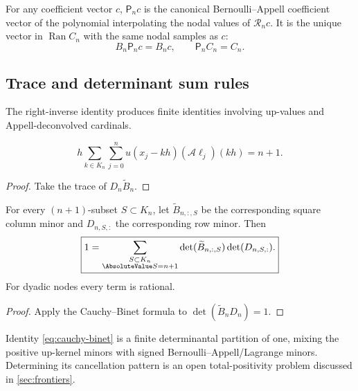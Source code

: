 \documentclass[11pt,oneside]{article}
\numberwithin{equation}{section}
\theoremstyle{definition}
\theoremstyle{remark}
\newcommand{\Ran}{\operatorname{Ran}}
\newcommand{\App}{\mathscr A}
\newcommand{\Synth}{\mathcal R}
\newcommand{\Proj}{\mathsf P}
\begin{document}
\begin{corollary}
\label{cor:canonicalization}
For any coefficient vector $c$, $\Proj_nc$ is the canonical
Bernoulli--Appell coefficient vector of the polynomial interpolating the
nodal values of $\Synth_nc$.  It is the unique vector in $\Ran C_n$ with the
same nodal samples as $c$:
\begin{equation}
 B_n\Proj_nc=B_nc,
 \qquad
 \Proj_nC_n=C_n.
 \label{eq:canonicalization}
\end{equation}
\end{corollary}

\subsection{Trace and determinant sum rules}

The right-inverse identity produces finite identities involving up-values and
Appell-deconvolved cardinals.

\begin{corollary}
\label{cor:trace-identity}
\begin{equation}
 \boxed{
 h\sum_{k\in K_n}\sum_{j=0}^{n}
 u(x_j-kh)(\App\ell_j)(kh)=n+1.
 }
 \label{eq:trace-sum}
\end{equation}
\end{corollary}

\begin{proof}
Take the trace of $D_n\widetilde B_n$.
\end{proof}

\begin{corollary}
\label{cor:cauchy-binet}
For every $(n+1)$-subset $S\subset K_n$, let
$\widetilde B_{n,:,S}$ be the corresponding square column minor and
$D_{n,S,:}$ the corresponding row minor.  Then
\begin{equation}
 \boxed{
 1=\sum_{\substack{S\subset K_n\\\AbsoluteValue S=n+1}}
 \det(\widetilde B_{n,:,S})\det(D_{n,S,:}).
 }
 \label{eq:cauchy-binet}
\end{equation}
For dyadic nodes every term is rational.
\end{corollary}

\begin{proof}
Apply the Cauchy--Binet formula to
$\det(\widetilde B_nD_n)=1$.
\end{proof}

Identity \eqref{eq:cauchy-binet} is a finite determinantal partition of one,
mixing the positive up-kernel minors with signed Bernoulli--Appell/Lagrange
minors.  Determining its cancellation pattern is an open total-positivity
problem discussed in \cref{sec:frontiers}.
\end{document}
